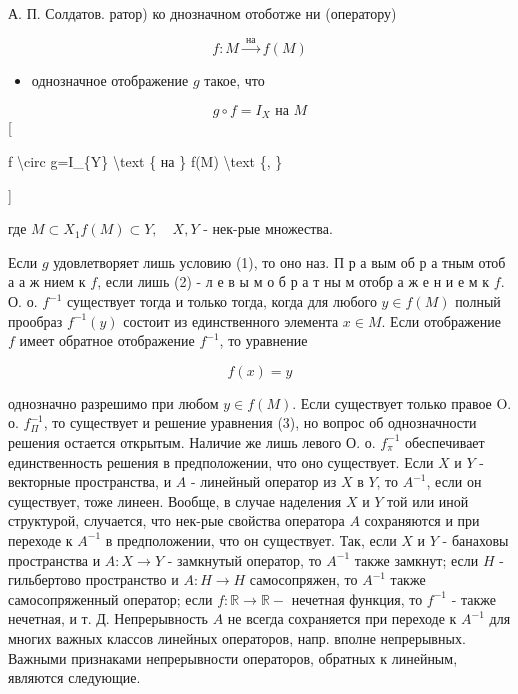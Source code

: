 \documentclass[10pt]{article}
\begin{document}
А. П. Солдатов. ратор) ко днозначном отоботже ни (оператору)



\[

f: M \stackrel{\text { на }}{\rightarrow} f(M)

\]



\begin{itemize}

  \item однозначное отображение $g$ такое, что

\end{itemize}



\[

g \circ f=I_{X} \text { на } M

\][



f \textbackslash circ g=I\_\{Y\} \textbackslash text \{ на \} f(M) \textbackslash text \{, \}

]



где $M \subset X_{1} f(M) \subset Y, \quad X, Y$ - нек-рые множества.



Если $g$ удовлетворяет лишь условию (1), то оно наз. П р а вым об р а тным отоб а а ж нием к $f$, если лишь (2) - л е в ы м о б р а т ны м отобр а ж е н и е м к $f$. О. о. $f^{-1}$ существует тогда и только тогда, когда для любого $y \in f(M)$ полный прообраз $f^{-1}(y)$ состоит из единственного элемента $x \in M$. Если отображение $f$ имеет обратное отображение $f^{-1}$, то уравнение



\[

f(x)=y

\]



однозначно разрешимо при любом $y \in f(M)$. Если существует только правое O. о. $f_{\Pi}^{-1}$, то существует и решение уравнения (3), но вопрос об однозначности решения остается открытым. Наличие же лишь левого О. о. $f_{\pi}^{-1}$ обеспечивает единственность решения в предположении, что оно существует. Если $X$ и $Y$ - векторные пространства, и $A$ - линейный оператор из $X$ в $Y$, то $A^{-1}$, если он существует, тоже линеен. Вообще, в случае наделения $X$ и $Y$ той или иной структурой, случается, что нек-рые свойства оператора $A$ сохраняются и при переходе к $A^{-1}$ в предположении, что он существует. Так, если $X$ и $Y$ - банаховы пространства и $A: X \rightarrow Y$ - замкнутый оператор, то $A^{-1}$ также замкнут; если $H$ - гильбертово пространство и $A: H \rightarrow H$ самосопряжен, то $A^{-1}$ также самосопряженный оператор; если $f: \mathbb{R} \rightarrow \mathbb{R}-$ нечетная функция, то $f^{-1}$ - также нечетная, и т. Д. Непрерывность $A$ не всегда сохраняется при переходе к $A^{-1}$ для многих важных классов линейных операторов, напр. вполне непрерывных. Важными признаками непрерывности операторов, обратных к линейным, являются следующие.
\end{document}
